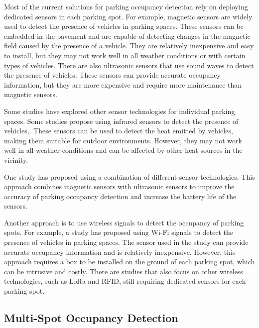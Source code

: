 Most of the current solutions for parking occupancy detection rely on deploying dedicated sensors in each parking spot. For example, magnetic sensors are widely used to detect the presence of vehicles in parking spaces. These sensors can be embedded in the pavement and are capable of detecting changes in the magnetic field caused by the presence of a vehicle. They are relatively inexpensive and easy to install, but they may not work well in all weather conditions or with certain types of vehicles. There are also ultrasonic sensors that use sound waves to detect the presence of vehicles. These sensors can provide accurate occupancy information, but they are more expensive and require more maintenance than magnetic sensors. 

Some studies have explored other sensor technologies for individual parking spaces. Some studies propose using infrared sensors to detect the presence of vehicles\cite{HumairaNishat2024IRSB},\cite{DHEEVEN2024100953}. These sensors can be used to detect the heat emitted by vehicles, making them suitable for outdoor environments. However, they may not work well in all weather conditions and can be affected by other heat sources in the vicinity. 

One study has proposed using a combination of different sensor technologies\cite{Zhang2022ParkingDU}. This approach combines magnetic sensors with ultrasonic sensors to improve the accuracy of parking occupancy detection and increase the battery life of the sensors.

Another approach is to use wireless signals to detect the occupancy of parking spots. For example, a study has proposed using Wi-Fi signals to detect the presence of vehicles in parking spaces\cite{9881350}. The sensor used in the study can provide accurate occupancy information and is relatively inexpensive. However, this approach requires a box to be installed on the ground of each parking spot, which can be intrusive and costly. There are studies that also focus on other wireless technologies, such as LoRa and RFID\cite{8938183}, still requiring dedicated sensors for each parking spot.


\subsection{Multi-Spot Occupancy Detection}

